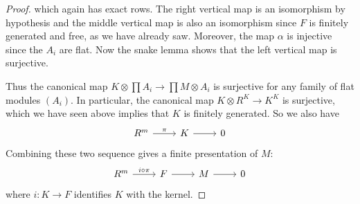 \begin{proof}
which again has exact rows. The right vertical map is an isomorphism by hypothesis and the middle vertical map is also an isomorphism since $F$ is finitely generated and free, as we have already saw. Moreover, the map $\alpha$ is injective since the $A_i$ are flat. Now the snake lemma shows that the left vertical map is surjective.\par
Thus the canonical map $K\otimes\prod A_i\to\prod M\otimes A_i$ is surjective for any family of flat modules $(A_i)$. In particular, the canonical map $K\otimes R^K\to K^K$ is surjective, which we have seen above implies that $K$ is finitely generated. So we also have
\[\begin{tikzcd}
R^m\ar[r,"\pi"]&K\ar[r]&0
\end{tikzcd}\]
Combining these two sequence gives a finite presentation of $M$:
\[\begin{tikzcd}
R^m\ar[r,"i\circ\pi"]&F\ar[r]&M\ar[r]&0
\end{tikzcd}\]
where $i:K\to F$ identifies $K$ with the kernel.
\end{proof}
